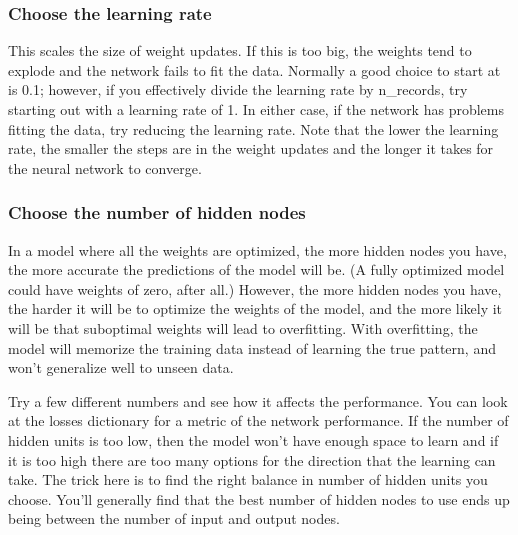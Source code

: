 \documentclass[11pt]{article}
\begin{document}
\hypertarget{choose-the-learning-rate}{%
\subsubsection{Choose the learning
rate}\label{choose-the-learning-rate}}

This scales the size of weight updates. If this is too big, the weights
tend to explode and the network fails to fit the data. Normally a good
choice to start at is 0.1; however, if you effectively divide the
learning rate by n\_records, try starting out with a learning rate of 1.
In either case, if the network has problems fitting the data, try
reducing the learning rate. Note that the lower the learning rate, the
smaller the steps are in the weight updates and the longer it takes for
the neural network to converge.

\hypertarget{choose-the-number-of-hidden-nodes}{%
\subsubsection{Choose the number of hidden
nodes}\label{choose-the-number-of-hidden-nodes}}

In a model where all the weights are optimized, the more hidden nodes
you have, the more accurate the predictions of the model will be. (A
fully optimized model could have weights of zero, after all.) However,
the more hidden nodes you have, the harder it will be to optimize the
weights of the model, and the more likely it will be that suboptimal
weights will lead to overfitting. With overfitting, the model will
memorize the training data instead of learning the true pattern, and
won't generalize well to unseen data.

Try a few different numbers and see how it affects the performance. You
can look at the losses dictionary for a metric of the network
performance. If the number of hidden units is too low, then the model
won't have enough space to learn and if it is too high there are too
many options for the direction that the learning can take. The trick
here is to find the right balance in number of hidden units you choose.
You'll generally find that the best number of hidden nodes to use ends
up being between the number of input and output nodes.
\end{document}
